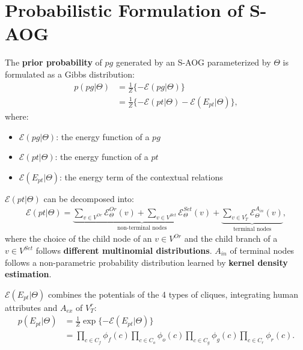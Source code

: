 \documentclass[10pt]{article}
\begin{document}
\section{Probabilistic Formulation of S-AOG}%
\label{sec:formulation}
The \textbf{prior probability} of $pg$ generated by an S-AOG parameterized by
$\Theta$ is formulated as a Gibbs distribution:
%
\begin{align}
  p(pg \vert \Theta) &= \frac{1}{Z} \{-\mathcal{E}(pg \vert \Theta)\} \label{eq:1} \\
                     &= \frac{1}{Z} \{-\mathcal{E}(pt \vert \Theta) - \mathcal{E}(E_{pt} \vert \Theta)\}, \label{eq:2}
\end{align}
%
where:
%
\begin{itemize}
  \item $\mathcal{E}(pg \vert \Theta)$: the energy function of a $pg$
  \item $\mathcal{E}(pt \vert \Theta)$: the energy function of a $pt$
  \item $\mathcal{E}(E_{pt} \vert \Theta)$: the energy term of the contextual
    relations
\end{itemize}
%
$\mathcal{E}(pt \vert \Theta)$ can be decomposed into:
%
\begin{align}
  \label{eq:3}
  \mathcal{E}(pt \vert \Theta) = \underbrace{\sum_{v \in V^{Or}} \mathcal{E}^{Or}_{\Theta}(v) + \sum_{v \in V^{Set}} \mathcal{E}^{Set}_{\Theta}(v)}_{\text{non-terminal nodes}} + \underbrace{\sum_{v \in V^r_T} \mathcal{E}^{A_{in}}_{\Theta}(v)}_{\text{terminal nodes}},
\end{align}
%
where the choice of the child node of an $v \in V^{Or}$ and the child branch of
a $v \in V^{Set}$ follows \textbf{different multinomial distributions}. $A_{in}$
of terminal nodes follows a non-parametric probability distribution learned by
\textbf{kernel density estimation}.

$\mathcal{E}(E_{pt} \vert \Theta)$ combines the potentials of the 4 types of
cliques, integrating human attributes and $A_{ex}$ of $V^r_T$:
%
\begin{align}
  p(E_{pt} \vert \Theta) &= \frac{1}{Z} \exp \{-\mathcal{E}(E_{pt} \vert \Theta)\} \label{eq:4} \\
                         &= \prod_{c \in C_f} \phi_f(c) \prod_{c \in C_o} \phi_o(c) \prod_{c \in C_g} \phi_g(c) \prod_{c \in C_r} \phi_r(c). \label{eq:5}
\end{align}
%
\end{document}
